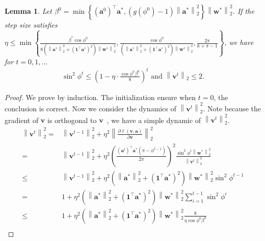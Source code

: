 \documentclass{article}
\newcommand{\firstlayer}{w}
\newcommand{\firstlayerWN}{v}
\newcommand{\secondlayer}{a}
\newcommand{\vect}[1]{\mathbf{#1}}
\newcommand{\norm}[1]{\left\|#1\right\|}
\newtheorem{lem}{Lemma}[section]
\begin{document}
\begin{lem}
\label{lem:firstlayerWN_norm_always_small}
	Let $\beta^0 = \min\left\{\left(\vect{\secondlayer}^0\right)^\top \vect{\secondlayer}^*,\left(g(\phi^0)-1\right)\norm{\vect{\secondlayer}^*}_2^2\right\}\norm{\vect{\firstlayer}^*}_2^2$.
	If the step size satisfies $\eta \le \min\left\{\frac{\beta^*\cos\phi^0}{8\left(\norm{\vect{\secondlayer}^*}_2^2+\left(\vect{1}^\top \vect{\secondlayer}^*\right)^2\right)\norm{\vect{\firstlayer}^*}_2^2}, \frac{\cos\phi^0}{\left(\norm{\vect{\secondlayer}^*}_2^2+\left(\vect{1}^\top \vect{\secondlayer}^*\right)^2\right)\norm{\vect{\firstlayer}^*}_2^2}, \frac{2\pi}{k+\pi-1}\right\}$, we have for $t=0,1,\ldots$\begin{align*}
	\sin^2\phi^{t} \le \left(1-\eta\cdot\frac{\cos\phi^0\beta^0}{8}\right)^t \text{ and }\norm{\vect{\firstlayerWN}^t}_2 \le 2.
	\end{align*}
\end{lem}\begin{proof}
We prove by induction.
The initialization ensure when $t=0$, the conclusion is correct.
Now we consider the dynamics of $\norm{\vect{\firstlayerWN}^t}_2^2$.
Note because the gradient of $\vect{\firstlayerWN}$ is orthogonal to $\vect{\firstlayerWN}$~\citep{salimans2016weight}, we have a simple dynamic of $\norm{\vect{\firstlayerWN}^t}_2^2$.
\begin{align*}
\norm{\vect{\firstlayerWN}^{t}}_2^2 = &\norm{\vect{\firstlayerWN}^{t-1}}_2^2 + \eta^2\norm{\frac{\partial \ell\left(\vect{\firstlayerWN},\vect{\secondlayer}\right)}{\partial \vect{\firstlayerWN}}}_2^2 \\
= & \norm{\vect{\firstlayerWN}^{t-1}}_2^2 + \eta^2\left(\frac{\left(\vect{\secondlayer}^t\right)^\top\vect{\secondlayer}^*\left(\pi-\phi^{t-1}\right)}{2\pi}\right)^2\frac{\sin^2\phi^t\norm{\vect{\firstlayer}^*}_2^2}{\norm{\vect{\firstlayerWN}^t}_2^2}\\
\le & \norm{\vect{\firstlayerWN}^{t-1}}_2^2 + \eta^2\left(\norm{\vect{\secondlayer}^*}_2^2+\left(\vect{1}^\top \vect{\secondlayer}^*\right)^2\right)\norm{\vect{\firstlayer}^*}_2^2\sin^2\phi^{t-1}\\
= & 1 + \eta^2\left(\norm{\vect{\secondlayer}^*}_2^2+\left(\vect{1}^\top \vect{\secondlayer}^*\right)^2\right)\norm{\vect{\firstlayer}^*}_2^2\sum_{i=1}^{t-1}\sin^2\phi^i\\
\le & 1 +\eta^2\left(\norm{\vect{\secondlayer}^*}_2^2+\left(\vect{1}^\top \vect{\secondlayer}^*\right)^2\right)\norm{\vect{\firstlayer}^*}_2^2\frac{8}{\eta\cos\phi^0\beta^0}\\

\end{align*}
\end{proof}
\end{document}

